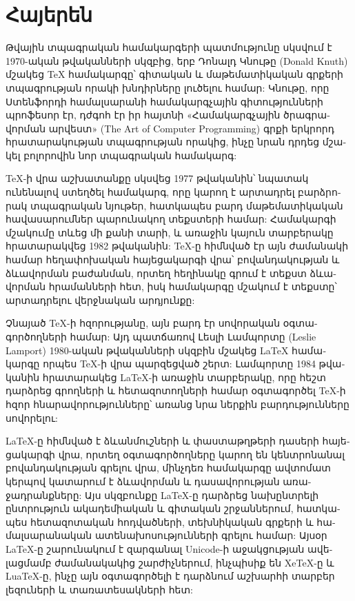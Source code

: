 \documentclass[a4paper,12pt]{article}
\begin{document}
\section{\textarmenian{Հայերեն}}
\begin{armenian}
  Թվային տպագրական համակարգերի պատմությունը սկսվում է 1970-ական թվականների սկզբից, երբ Դոնալդ Կնութը (Donald Knuth) մշակեց TeX համակարգը՝ գիտական և մաթեմատիկական գրքերի տպագրության որակի խնդիրները լուծելու համար: Կնութը, որը Ստենֆորդի համալսարանի համակարգչային գիտությունների պրոֆեսոր էր, դժգոհ էր իր հայտնի «Համակարգչային ծրագրավորման արվեստ» (The Art of Computer Programming) գրքի երկրորդ հրատարակության տպագրության որակից, ինչը նրան դրդեց մշակել բոլորովին նոր տպագրական համակարգ:
  
  TeX-ի վրա աշխատանքը սկսվեց 1977 թվականին՝ նպատակ ունենալով ստեղծել համակարգ, որը կարող է արտադրել բարձրորակ տպագրական նյութեր, հատկապես բարդ մաթեմատիկական հավասարումներ պարունակող տեքստերի համար: Համակարգի մշակումը տևեց մի քանի տարի, և առաջին կայուն տարբերակը հրատարակվեց 1982 թվականին: TeX-ը հիմնված էր այն ժամանակի համար հեղափոխական հայեցակարգի վրա՝ բովանդակության և ձևավորման բաժանման, որտեղ հեղինակը գրում է տեքստ ձևավորման հրամանների հետ, իսկ համակարգը մշակում է տեքստը՝ արտադրելու վերջնական արդյունքը:
  
  Չնայած TeX-ի հզորությանը, այն բարդ էր սովորական օգտագործողների համար: Այդ պատճառով Լեսլի Լամպորտը (Leslie Lamport) 1980-ական թվականների սկզբին մշակեց LaTeX համակարգը որպես TeX-ի վրա պարզեցված շերտ: Լամպորտը 1984 թվականին հրատարակեց LaTeX-ի առաջին տարբերակը, որը հեշտ դարձրեց գրողների և հետազոտողների համար օգտագործել TeX-ի հզոր հնարավորությունները՝ առանց նրա ներքին բարդությունները սովորելու:
  
  LaTeX-ը հիմնված է ձևանմուշների և փաստաթղթերի դասերի հայեցակարգի վրա, որտեղ օգտագործողները կարող են կենտրոնանալ բովանդակության գրելու վրա, մինչդեռ համակարգը ավտոմատ կերպով կատարում է ձևավորման և դասավորության առաջադրանքները: Այս սկզբունքը LaTeX-ը դարձրեց նախընտրելի ընտրություն ակադեմիական և գիտական շրջաններում, հատկապես հետազոտական հոդվածների, տեխնիկական գրքերի և համալսարանական ատենախոսությունների գրելու համար: Այսօր LaTeX-ը շարունակում է զարգանալ Unicode-ի աջակցության ավելացմամբ ժամանակակից շարժիչներում, ինչպիսիք են XeTeX-ը և LuaTeX-ը, ինչը այն օգտագործելի է դարձնում աշխարհի տարբեր լեզուների և տառատեսակների հետ:
\end{armenian}
\end{document}
